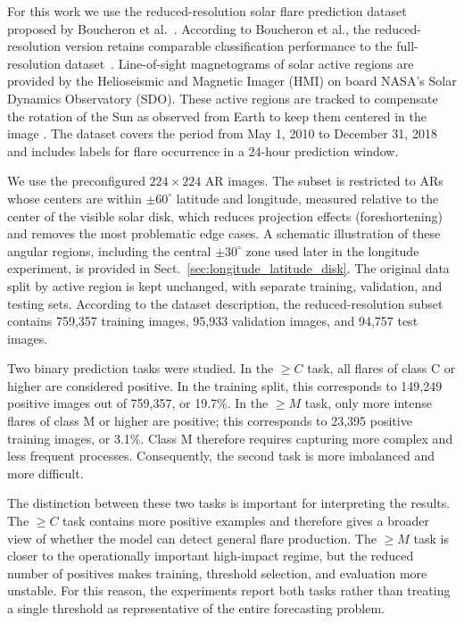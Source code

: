 For this work we use the reduced-resolution solar flare prediction dataset proposed by Boucheron et al.~\cite{ref_boucheron}. According to Boucheron et al., the reduced-resolution version retains comparable classification performance to the full-resolution dataset~\cite{ref_boucheron}. Line-of-sight magnetograms of solar active regions are provided by the Helioseismic and Magnetic Imager (HMI) on board NASA's Solar Dynamics Observatory (SDO). These active regions are tracked to compensate the rotation of the Sun as observed from Earth  to keep them centered in the image \cite{ref_boucheron}. The dataset covers the period from May 1, 2010 to December 31, 2018 and includes labels for flare occurrence in a 24-hour prediction window.

We use the preconfigured $224 \times 224$ AR images. The subset is restricted to ARs whose centers are within $\pm 60^\circ$ latitude and longitude, measured relative to the center of the visible solar disk, which reduces projection effects (foreshortening) and removes the most problematic edge cases. A schematic illustration of these angular regions, including the central $\pm 30^\circ$ zone used later in the longitude experiment, is provided in Sect.~\ref{sec:longitude_latitude_disk}. The original data split by active region is kept unchanged, with separate training, validation, and testing sets. According to the dataset description, the reduced-resolution subset contains 759{,}357 training images, 95{,}933 validation images, and 94{,}757 test images.

Two binary prediction tasks were studied. In the $\geq C$ task, all flares of class C or higher are considered positive. In the training split, this corresponds to 149{,}249 positive images out of 759{,}357, or 19.7\%. In the $\geq M$ task, only more intense flares of class M or higher are positive; this corresponds to 23{,}395 positive training images, or 3.1\%. Class M therefore requires capturing more complex and less frequent processes. Consequently, the second task is more imbalanced and more difficult.

The distinction between these two tasks is important for interpreting the results. The $\geq C$ task contains more positive examples and therefore gives a broader view of whether the model can detect general flare production. The $\geq M$ task is closer to the operationally important high-impact regime, but the reduced number of positives makes training, threshold selection, and evaluation more unstable. For this reason, the experiments report both tasks rather than treating a single threshold as representative of the entire forecasting problem.

